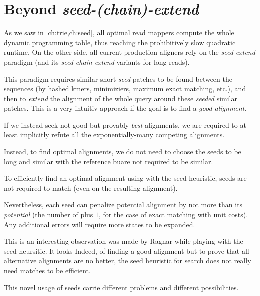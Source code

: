 \section{Beyond \emph{seed-(chain)-extend}}

As we saw in \cref{ch:trie,ch:seed}, all optimal read mappers compute the whole
dynamic programming table, thus reaching the prohibitively slow quadratic
runtime. On the other side, all current production aligners rely on the
\emph{seed-extend} paradigm (and its \emph{seed-chain-extend} variants for long
reads).

This paradigm requires similar short \emph{seed} patches to be found
between the sequences (\eg by hashed kmers, minimiziers, maximum exact matching,
etc.), and then to \emph{extend} the alignment of the whole query around these
\emph{seeded} similar patches. This is a very intuitiv approach if the goal is
to find a \emph{good alignment}.

If we instead seek not good but provably \emph{best} alignments, we are required
to at least implicitly refute all the exponentially-many competing alignments.

Instead, to find optimal alignments, we do not need to choose the seeds to be
long and similar with the reference buare not required to be similar.

\begin{observation}
    To efficiently find an optimal alignment using \A with the seed heuristic,
    seeds are not required to match (even on the resulting alignment).
\end{observation}

Nevertheless, each seed can penalize potential alignment by not more than its
\emph{potential} (\ie the number of plus $1$, for the case of exact matching
with unit costs). Any additional errors will require more states to be expanded.

This is an interesting observation was made by Ragnar while playing with the
seed heursitic. It looks Indeed, of finding a good alignment but to prove that all
alternative alignments are no better, the seed heuristic for \A search does not
really need matches to be efficient.

This novel usage of seeds carrie different problems and different possibilities.